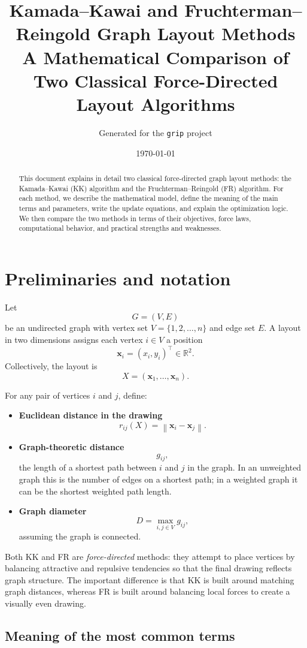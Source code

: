 \documentclass[11pt]{article}
\title{Kamada--Kawai and Fruchterman--Reingold Graph Layout Methods\\
\large A Mathematical Comparison of Two Classical Force-Directed Layout Algorithms}
\author{Generated for the \texttt{grip} project}
\date{\today}
\newcommand{\R}{\mathbb{R}}
\newcommand{\vect}[1]{\boldsymbol{#1}}
\newcommand{\norm}[1]{\left\lVert #1 \right\rVert}
\begin{document}
\maketitle

\begin{abstract}
This document explains in detail two classical force-directed graph layout
methods: the Kamada--Kawai (KK) algorithm and the Fruchterman--Reingold (FR)
algorithm. For each method, we describe the mathematical model, define the
meaning of the main terms and parameters, write the update equations, and
explain the optimization logic. We then compare the two methods in terms of
their objectives, force laws, computational behavior, and practical strengths
and weaknesses.
\end{abstract}

\section{Preliminaries and notation}

Let
\[
G = (V, E)
\]
be an undirected graph with vertex set $V = \{1, 2, \dots, n\}$ and edge set
$E$. A layout in two dimensions assigns each vertex $i \in V$ a position
\[
\vect{x}_i = (x_i, y_i)^\top \in \R^2.
\]
Collectively, the layout is
\[
X = (\vect{x}_1, \dots, \vect{x}_n).
\]

For any pair of vertices $i$ and $j$, define:
\begin{itemize}[leftmargin=1.5em]
\item \textbf{Euclidean distance in the drawing}
\[
r_{ij}(X) = \norm{\vect{x}_i - \vect{x}_j}.
\]
\item \textbf{Graph-theoretic distance}
\[
g_{ij},
\]
the length of a shortest path between $i$ and $j$ in the graph. In an
unweighted graph this is the number of edges on a shortest path; in a weighted
graph it can be the shortest weighted path length.
\item \textbf{Graph diameter}
\[
D = \max_{i,j \in V} g_{ij},
\]
assuming the graph is connected.
\end{itemize}

Both KK and FR are \emph{force-directed} methods: they attempt to place
vertices by balancing attractive and repulsive tendencies so that the final
drawing reflects graph structure. The important difference is that KK is built
around matching graph distances, whereas FR is built around balancing local
forces to create a visually even drawing.

\subsection{Meaning of the most common terms}
\end{document}
